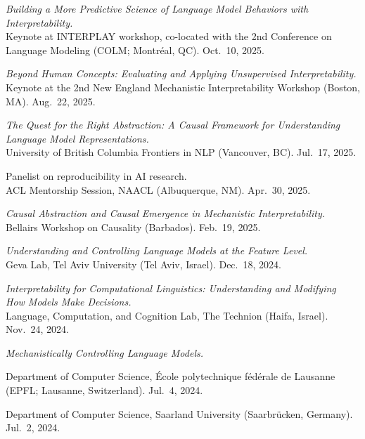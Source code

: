 \documentclass[10pt]{article}
\newcommand{\halfblankline}{\quad\vspace{-0.5\baselineskip}\pagebreak[3]}
\begin{document}
	\emph{Building a More Predictive Science of Language Model Behaviors with Interpretability.}\\
	Keynote at INTERPLAY workshop, co-located with the 2nd Conference on Language Modeling (COLM; Montréal, QC). Oct.\ 10, 2025.
		
	\halfblankline

	\emph{Beyond Human Concepts: Evaluating and Applying Unsupervised Interpretability.}\\
	Keynote at the 2nd New England Mechanistic Interpretability Workshop (Boston, MA). Aug.\ 22, 2025.

	\halfblankline
	
	\emph{The Quest for the Right Abstraction: A Causal Framework for Understanding Language Model Representations.}\\
	University of British Columbia Frontiers in NLP (Vancouver, BC). Jul.\ 17, 2025.
	
	\halfblankline
	
	Panelist on reproducibility in AI research.\\
	ACL Mentorship Session, NAACL (Albuquerque, NM). Apr.\ 30, 2025.
	
	\halfblankline
	
	\emph{Causal Abstraction and Causal Emergence in Mechanistic Interpretability.}\\
	Bellairs Workshop on Causality (Barbados). Feb.\ 19, 2025.

	\halfblankline

	\emph{Understanding and Controlling Language Models at the Feature Level.}\\
	Geva Lab, Tel Aviv University (Tel Aviv, Israel). Dec.\ 18, 2024.

	\halfblankline

	\emph{Interpretability for Computational Linguistics: Understanding and Modifying\\How Models Make Decisions.}\\
	Language, Computation, and Cognition Lab, The Technion (Haifa, Israel). Nov.\ 24, 2024.

	\halfblankline

	\emph{Mechanistically Controlling Language Models.}
	\begin{innerlist}
	\item Department of Computer Science, École polytechnique fédérale de Lausanne (EPFL; Lausanne, Switzerland). Jul.\ 4, 2024.
	\item Department of Computer Science, Saarland University (Saarbrücken, Germany). Jul.\ 2, 2024.
	\end{innerlist}
	
\end{document}
